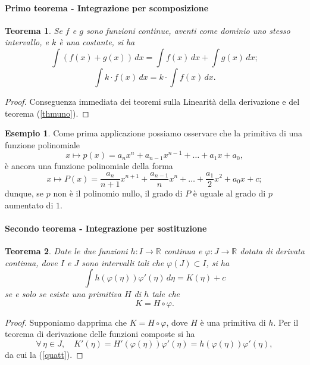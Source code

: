 \documentclass{article}
\theoremstyle{plain}
\newtheorem{thm}{Teorema}[section]
\theoremstyle{definition}
\newtheorem{exmp}{Esempio}[section]
\theoremstyle{remark}
\begin{document}
\paragraph{Primo teorema - Integrazione per scomposizione}
\begin{bxthm}
\begin{thm}\label{thmquttro}
    Se $f$ e $g$ sono funzioni continue, aventi come dominio uno stesso intervallo, e $k$ è una costante, si ha 
    \[\int(f(x)+g(x))\,dx=\int f(x)\,dx+\int g(x)\,dx;\]
    \[\int k\cdot f(x)\,dx=k\cdot \int f(x)\,dx.\]
\end{thm}
\end{bxthm}
\begin{proof}
    Conseguenza immediata dei teoremi sulla Linearità della derivazione e del teorema (\ref{thmuno}).
\end{proof}

\vspace{10pt}

\begin{exmp}
    Come prima applicazione possiamo osservare che la primitiva di una funzione polinomiale 
    \[x\mapsto p(x)=a_nx^n+a_{n-1}x^{n-1}+\dots+a_1x+a_0,\]
    è ancora una funzione polinomiale della forma 
    \[x\mapsto P(x)=\dfrac{a_n}{n+1}x^{n+1}+\dfrac{a_{n-1}}{n}x^n+\dots+\dfrac{a_1}{2}x^2+a_0x+c;\]
    dunque, se $p$ non è il polinomio nullo, il grado di $P$ è uguale al grado di $p$ aumentato di $1$.
\end{exmp}

\vspace{10pt}

\paragraph{Secondo teorema - Integrazione per sostituzione}
\begin{bxthm}
\begin{thm}\label{thmcinq}
    Date le due funzioni $h:I\to\mathbb{R}$ continua e $\varphi:J\to\mathbb{R}$ dotata di derivata continua, dove $I$ e $J$ sono intervalli tali che $\varphi(J)\subset I$, si ha 
    \begin{equation}
        \int h(\varphi(\eta))\varphi'(\eta)\,d\eta=K(\eta)+c\label{quatt}
    \end{equation}
    se e solo se esiste una primitiva $H$ di $h$ tale che \[K=H\circ \varphi.\]
\end{thm}
\end{bxthm}
\begin{proof}
    Supponiamo dapprima che $K=H\circ\varphi$, dove $H$ è una primitiva di $h$. Per il teorema di derivazione delle funzioni composte si ha 
    \[\forall\,\eta\in J,\quad K'(\eta)=H'(\varphi(\eta))\varphi'(\eta)=h(\varphi(\eta))\varphi'(\eta),\]
    da cui la (\ref{quatt}).
\end{proof}
\end{document}

